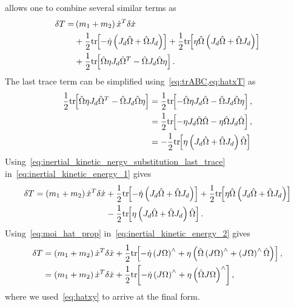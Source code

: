  allows one to combine several similar terms as
\begin{align}\label{eq:inertial_kinetic_energy_1}
    \delta T =&\left( m_1 + m_2 \right) \dot{x}^T \delta \dot{x} \nonumber\\
              &+ \frac{1}{2} \mathrm{tr}\negthickspace\left[ -\dot{\eta} \left( J_d \hat{\Omega} + \hat{\Omega} J_d \right) \right] + \frac{1}{2} \mathrm{tr}\negthickspace\left[ \eta \hat{\Omega} \left( J_d \hat{\Omega} + \hat{\Omega} J_d \right) \right] \nonumber \\
              &+ \frac{1}{2} \mathrm{tr}\negthickspace\left[  \hat{\Omega} \eta J_d \hat{\Omega}^T - \hat{\Omega} J_d \hat{\Omega} \eta \right].
\end{align}
The last trace term can be simplified using~\cref{eq:trABC,eq:hatxT} as
\begin{align}\label{eq:inertial_kinetic_nergy_substitution_last_trace}
    \frac{1}{2} \mathrm{tr}\negthickspace\left[  \hat{\Omega} \eta J_d \hat{\Omega}^T - \hat{\Omega} J_d \hat{\Omega} \eta \right] &= \frac{1}{2} \mathrm{tr}\negthickspace\left[  - \hat{\Omega} \eta J_d \hat{\Omega} - \hat{\Omega} J_d \hat{\Omega} \eta \right],\nonumber \\
                                                                                                      &= \frac{1}{2} \mathrm{tr}\negthickspace\left[  - \eta J_d \hat{\Omega} \hat{\Omega} - \eta \hat{\Omega} J_d \hat{\Omega}  \right], \nonumber\\
                                                                                                      &= -\frac{1}{2} \mathrm{tr}\negthickspace\left[ \eta \left( J_d \hat{\Omega} + \hat{\Omega} J_d  \right)\hat{\Omega} \right]
\end{align}
Using~\cref{eq:inertial_kinetic_nergy_substitution_last_trace} in~\cref{eq:inertial_kinetic_energy_1} gives
\begin{align}\label{eq:inertial_kinetic_energy_2}
    \delta T =\left( m_1 + m_2 \right) \dot{x}^T \delta \dot{x} &+ \frac{1}{2} \mathrm{tr}\negthickspace\left[ -\dot{\eta} \left( J_d \hat{\Omega} + \hat{\Omega} J_d \right) \right] + \frac{1}{2} \mathrm{tr}\negthickspace\left[ \eta \hat{\Omega} \left( J_d \hat{\Omega} + \hat{\Omega} J_d \right) \right] \nonumber \\
              &- \frac{1}{2} \mathrm{tr}\negthickspace\left[  \eta \left( J_d \hat{\Omega} + \hat{\Omega} J_d  \right)\hat{\Omega} \right].
\end{align}
Using~\cref{eq:moi_hat_prop} in~\cref{eq:inertial_kinetic_energy_2} gives
\begin{align}\label{eq:kinetic_energy_variation_final}
    \delta T &= \left( m_1 + m_2 \right) \dot{x}^T \delta \dot{x} + \frac{1}{2} \mathrm{tr}\negthickspace\left[ -\dot{\eta} \left( J\Omega \right)^\wedge + \eta \left(  \hat{\Omega} \left( J\Omega \right)^\wedge + \left( J \Omega \right)^\wedge \hat{\Omega} \right)  \right] , \nonumber\\
             &=  \left( m_1 + m_2 \right) \dot{x}^T \delta \dot{x} + \frac{1}{2} \mathrm{tr}\negthickspace\left[  - \dot{\eta} \left( J \Omega \right)^\wedge + \eta \left( \hat{\Omega} J \Omega \right)^\wedge \right] , 
\end{align}
where we used~\cref{eq:hatxy} to arrive at the final form.



